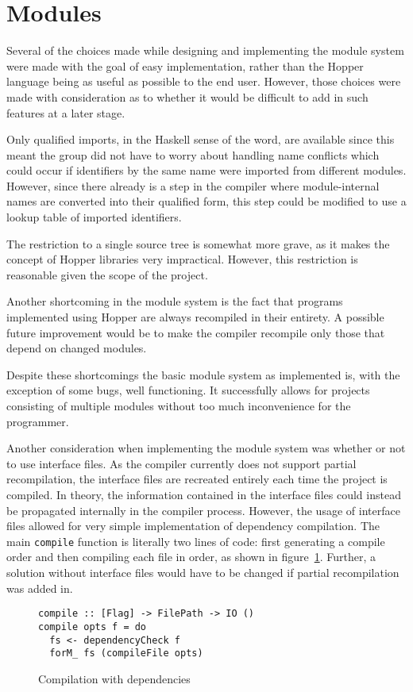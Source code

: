 \section{Modules}

Several of the choices made while designing and implementing the module system were made with the goal of easy implementation, rather than the Hopper language being as useful as possible to the end user. However, those choices were made with consideration as to whether it would be difficult to add in such features at a later stage.

Only qualified imports, in the Haskell sense of the word, are available since this meant the group did not have to worry about handling name conflicts which could occur if identifiers by the same name were imported from different modules. However, since there already is a step in the compiler where module-internal names are converted into their qualified form, this step could be modified to use a lookup table of imported identifiers.

The restriction to a single source tree is somewhat more grave, as it makes the concept of Hopper libraries very impractical. However, this restriction is reasonable given the scope of the project.

Another shortcoming in the module system is the fact that programs implemented using Hopper are always recompiled in their entirety. A possible future improvement would be to make the compiler recompile only those that depend on changed modules.

Despite these shortcomings the basic module system as implemented is, with the exception of some bugs, well functioning. It successfully allows for projects consisting of multiple modules without too much inconvenience for the programmer.

Another consideration when implementing the module system was whether or not to use interface files. As the compiler currently does not support partial recompilation, the interface files are recreated entirely each time the project is compiled. In theory, the information contained in the interface files could instead be propagated internally in the compiler process. However, the usage of interface files allowed for very simple implementation of dependency compilation. The main \texttt{compile} function is literally two lines of code: first generating a compile order and then compiling each file in order, as shown in figure~\ref{lst:compile}. Further, a solution without interface files would have to be changed if partial recompilation was added in.

\begin{figure}[!ht]
\centering
\begin{lstlisting} 
compile :: [Flag] -> FilePath -> IO ()
compile opts f = do
  fs <- dependencyCheck f
  forM_ fs (compileFile opts)
\end{lstlisting}
\caption{Compilation with dependencies}
\label{lst:compile}
\end{figure}